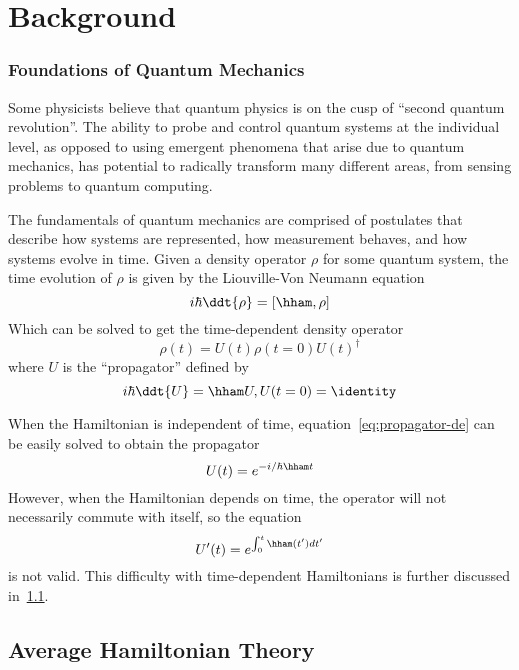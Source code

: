 \chapter{Background}

\subsection{Foundations of Quantum Mechanics}



Some physicists believe that quantum physics is on the cusp of ``second quantum revolution''\cite{quantum-rev}. The ability to probe and control quantum systems at the individual level, as opposed to using emergent phenomena that arise due to quantum mechanics, has potential to radically transform many different areas, from sensing problems to quantum computing.

The fundamentals of quantum mechanics are comprised of postulates that describe how systems are represented, how measurement behaves, and how systems evolve in time.
Given a density operator $\rho$ for some quantum system, the time evolution of $\rho$ is given by the Liouville-Von Neumann equation
\begin{equation}
    i\hbar \ddt{\rho} = [\hham, \rho]
\end{equation}
Which can be solved to get the time-dependent density operator
\begin{equation}\label{eq:density-time}
    \rho(t) = U(t) \rho(t=0) U(t)^\dagger
\end{equation}
where $U$ is the ``propagator'' defined by
\begin{equation}\label{eq:propagator-de}
    i\hbar \ddt{U} = \hham U, U(t=0) = \identity
\end{equation}

When the Hamiltonian is independent of time, equation~\ref{eq:propagator-de} can be easily solved to obtain the propagator
\[
U(t) = e^{-i/\hbar \hham t}
\]
However, when the Hamiltonian depends on time, the operator will not necessarily commute with itself, so the equation
\[
U'(t) = e^{\int_0^t \hham(t') dt'}
\]
is not valid. This difficulty with time-dependent Hamiltonians is further discussed in~\ref{sec:AHT}.



\section{Average Hamiltonian Theory}\label{sec:AHT}

